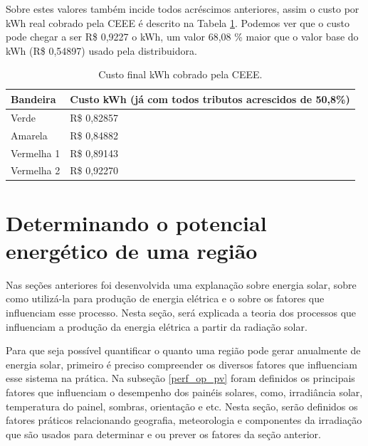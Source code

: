 Sobre estes valores também incide todos acréscimos anteriores, assim o custo por kWh real cobrado pela CEEE é descrito na Tabela \ref{kwh_ceee}. Podemos ver que o custo pode chegar a ser R\$ 0,9227 o kWh, um valor 68,08 \% maior que o valor base do kWh (R\$ 0,54897) usado pela distribuidora.

\begin{table}[htbp]
    \caption{Custo final kWh cobrado pela CEEE.}
        \begin{center}
            \begin{tabular}{ >{\centering\arraybackslash} m{3cm} >{\centering\arraybackslash} m{10cm}  }
                \hline
                Bandeira & Custo kWh \newline (já com todos tributos acrescidos de 50,8\%) \\ \hline
                Verde & R\$ 0,82857\\
                Amarela & R\$ 0,84882 \\
                Vermelha 1 & R\$ 0,89143\\
                Vermelha 2 & R\$ 0,92270 \\ \hline
            \end{tabular}
        \end{center}
    \label{kwh_ceee}
\end{table}

\newpage
\section{Determinando o potencial energético de uma região}

Nas seções anteriores foi desenvolvida uma explanação sobre energia solar, sobre como utilizá-la para produção de energia elétrica e o sobre os fatores que influenciam esse processo. Nesta seção, será explicada a teoria dos processos que influenciam a produção da energia elétrica a partir da radiação solar.

Para que seja possível quantificar o quanto uma região pode gerar anualmente de energia solar, primeiro é preciso compreender os diversos fatores que influenciam esse sistema na prática. Na subseção \ref{perf_op_pv} foram definidos os principais fatores que influenciam o desempenho dos painéis solares, como, irradiância solar, temperatura do painel, sombras, orientação e etc. Nesta seção, serão definidos os fatores práticos relacionando geografia, meteorologia e componentes da irradiação que são usados para determinar e ou prever os fatores da seção anterior.


